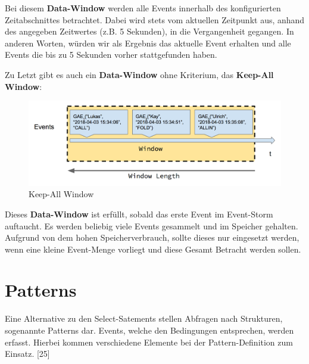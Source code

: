 Bei diesem \textbf{Data-Window} werden alle Events innerhalb des konfigurierten Zeitabschnittes betrachtet.
Dabei wird stets vom aktuellen Zeitpunkt aus, anhand des angegeben Zeitwertes (z.B. 5 Sekunden), in die Vergangenheit gegangen. In anderen Worten, würden wir als Ergebnis das aktuelle Event erhalten und alle Events die bis zu 5 Sekunden vorher stattgefunden haben.

Zu Letzt gibt es auch ein \textbf{Data-Window} ohne Kriterium, das \textbf{Keep-All Window}:

\begin{figure}[ht]
	\centering
	\includegraphics[width=\textwidth,height=\textheight,keepaspectratio]{images/data_window_keep_all.png}
	\caption{Keep-All Window}
	\label{KeepAllWindow}
\end{figure}

Dieses \textbf{Data-Window} ist erfüllt, sobald das erste Event im Event-Storm auftaucht. Es werden beliebig viele Events gesammelt und im Speicher gehalten.
Aufgrund von dem hohen Speicherverbrauch, sollte dieses nur eingesetzt werden, wenn eine kleine Event-Menge vorliegt und diese Gesamt Betracht werden sollen.

\section{Patterns}

Eine Alternative zu den Select-Satements stellen Abfragen nach Strukturen, sogenannte Patterns dar. Events, welche den Bedingungen entsprechen, werden erfasst. Hierbei kommen verschiedene Elemente bei der Pattern-Definition zum Einsatz.
\cite{EsperRef2018}[25]

